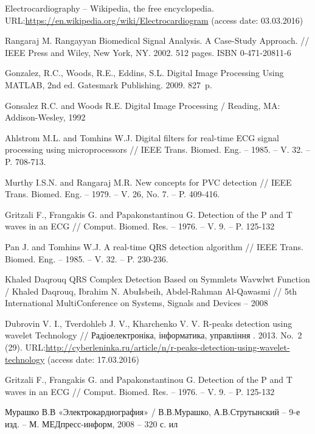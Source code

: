 \documentclass[runningheads]{AIIT}
\begin{document}
%
%
 \begin{thebibliography}{99}
  Electrocardiography -- Wikipedia, the free encyclopedia. URL:\url{https://en.wikipedia.org/wiki/Electrocardiogram} (access date: 03.03.2016)

  Rangaraj M. Rangayyan Biomedical Signal Analysis. A Case-Study Approach. // IEEE Press and Wiley, New York, NY. 2002. 512 pages. ISBN 0-471-20811-6

  Gonzalez, R.C., Woods, R.E., Eddins, S.L. Digital Image Processing Using MATLAB, 2nd ed. Gatesmark Publishing. 2009. 827~p.

  Gonsalez R.C. and Woods R.E. Digital Image Processing / Reading, MA: Addison-Wesley, 1992

  Ahlstrom M.L. and Tomhins W.J. Digital filters for real-time ECG signal processing using microprocessors // IEEE Trans. Biomed. Eng. – 1985. – V. 32. – P. 708-713.

  Murthy I.S.N. and Rangaraj M.R. New concepts for PVC detection // IEEE Trans. Biomed. Eng. – 1979. – V. 26, No. 7. – P. 409-416.

  Gritzali F., Frangakis G. and Papakonstantinou G. Detection of the P and T waves in an ECG // Comput. Biomed. Res. – 1976. – V. 9. – P. 125-132

  Pan J. and Tomhins W.J. A real-time QRS detection algorithm // IEEE Trans. Biomed. Eng. – 1985. – V. 32. – P. 230-236.

  Khaled Daqrouq QRS Complex Detection Based on Symmlets Wavwlwt Function / Khaled Daqrouq, Ibrahim N. AbuIsbeih, Abdel-Rahman Al-Qawasmi // 5th International MultiConference on Systems, Signals and Devices – 2008

  Dubrovin V. I., Tverdohleb J. V., Kharchenko V. V. R-peaks detection using wavelet Technology // Радіоелектроніка, інформатика, управління . 2013. No.~2 (29). URL:\url{http://cyberleninka.ru/article/n/r-peaks-detection-using-wavelet-technology} (access date: 17.03.2016)

  Gritzali F., Frangakis G. and Papakonstantinou G. Detection of the P and T waves in an ECG // Comput. Biomed. Res. – 1976. – V. 9. – P. 125-132

  Мурашко В.В «Электрокардиография» / В.В.Мурашко, А.В.Струтынский – 9-е изд. – М. МЕДпресс-информ, 2008 – 320 с. ил

 \end{thebibliography}
\end{document}
